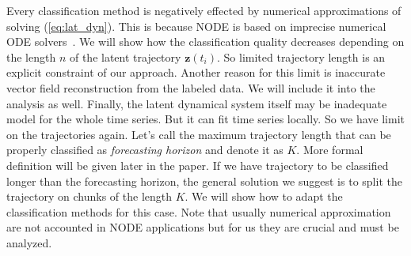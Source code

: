 \documentclass[referee, pdflatex, sn-mathphys-num]{sn-jnl}
\theoremstyle{definition}
\theoremstyle{plain}
\newcommand{\bz}{\ensuremath{\mathbf{z}}}
\begin{document}
		Every classification method is negatively effected by numerical approximations of solving (\ref{eq:lat_dyn}). This is because NODE is based on imprecise numerical ODE solvers~\cite{ode_solvers}. We will show how the classification quality decreases depending on the length $n$ of the latent trajectory $\bz(t_i)$. So limited trajectory length is an explicit constraint of our approach. Another reason for this limit is inaccurate vector field reconstruction from the labeled data. We will include it into the analysis as well. Finally, the latent dynamical system itself may be inadequate model for the whole time series. But it can fit time series locally. So we have limit on the trajectories again. Let's call the maximum trajectory length that can be properly classified as \emph{forecasting horizon} and denote it as $K$. More formal definition will be given later in the paper. If we have trajectory to be classified longer than the forecasting horizon, the general solution we suggest is to split the trajectory on chunks of the length $K$. We will show how to adapt the classification methods for this case. Note that usually numerical approximation are not accounted in NODE applications but for us they are crucial and must be analyzed.
		
		
		
		
		
		
		
		
		
	
 
\end{document}
